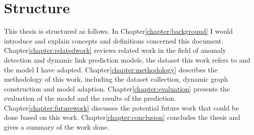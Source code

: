 \section{Structure}

This thesis is structured as follows. In Chapter\ref{chapter:background} I would introduce and explain concepts and definitions concerned this document. Chapter\ref{chapter:relatedwork} reviews related work in the field of anomaly detection and dynamic link prediction models, the dataset this work refers to and the model I have adapted. Chapter\ref{chapter:methodology} describes the methodology of this work, including the dataset collection, dynamic graph construction and model adaption. Chapter\ref{chapter:evaluation} presents the evaluation of the model and the results of the prediction. Chapter\ref{chapter:futurework} discusses the potential future work that could be done based on this work. Chapter\ref{chapter:conclusion} concludes the thesis and gives a summary of the work done.





